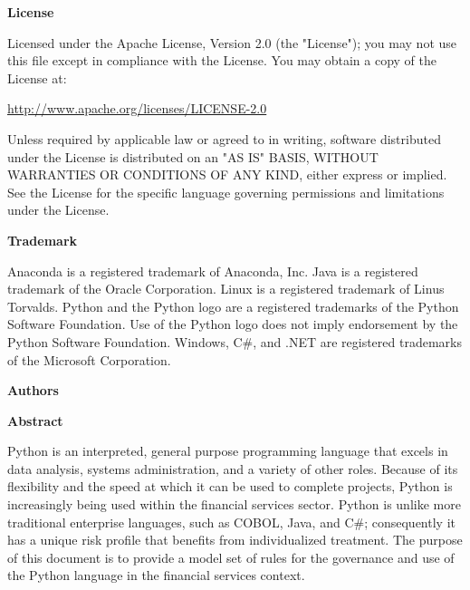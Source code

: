 \thispagestyle{empty}

\COPYRIGHT

\textbf{License}

Licensed under the Apache License, Version 2.0 (the "License"); you may not use this file except in compliance with the License. You may obtain a copy of the License at:

\url{http://www.apache.org/licenses/LICENSE-2.0}

Unless required by applicable law or agreed to in writing, software distributed under the License is distributed on an "AS IS" BASIS, WITHOUT WARRANTIES OR CONDITIONS OF ANY KIND, either express or implied. See the License for the specific language governing permissions and limitations under the License.

\textbf{Trademark}

Anaconda is a registered trademark of Anaconda, Inc. Java is a registered trademark of the Oracle Corporation. Linux is a registered trademark of Linus Torvalds. Python and the Python logo are a registered trademarks of the Python Software Foundation. Use of the Python logo does not imply endorsement by the Python Software Foundation. Windows, C\#, and .NET are registered trademarks of the Microsoft Corporation.

\textbf{Authors}

\AUTHORS

\textbf{Abstract}

Python is an interpreted, general purpose programming language that excels in data analysis, systems administration, and a variety of other roles. Because of its flexibility and the speed at which it can be used to complete projects, Python is increasingly being used within the financial services sector. Python is unlike more traditional enterprise languages, such as COBOL, Java, and C\#; consequently it has a unique risk profile that benefits from individualized treatment. The purpose of this document is to provide a model set of rules for the governance and use of the Python language in the financial services context.
